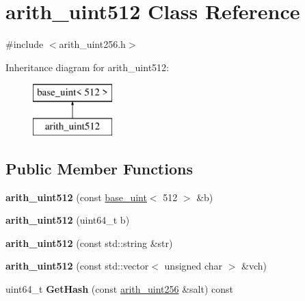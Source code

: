\hypertarget{classarith__uint512}{}\section{arith\+\_\+uint512 Class Reference}
\label{classarith__uint512}


{\ttfamily \#include $<$arith\+\_\+uint256.\+h$>$}

Inheritance diagram for arith\+\_\+uint512\+:\begin{figure}[H]
\begin{center}
\leavevmode
\includegraphics[height=2.000000cm]{classarith__uint512}
\end{center}
\end{figure}
\subsection*{Public Member Functions}
\begin{DoxyCompactItemize}
\item 
\mbox{\label{classarith__uint512_af8fa1e6795e1c5c1d1a634fb0fd3c436}} 
{\bfseries arith\+\_\+uint512} (const \mbox{\hyperlink{classbase__uint}{base\+\_\+uint}}$<$ 512 $>$ \&b)
\item 
\mbox{\label{classarith__uint512_acad15bc71a52323a5eb4402500f56b46}} 
{\bfseries arith\+\_\+uint512} (uint64\+\_\+t b)
\item 
\mbox{\label{classarith__uint512_af1ac85dcc8bcc5795318db17a400842f}} 
{\bfseries arith\+\_\+uint512} (const std\+::string \&str)
\item 
\mbox{\label{classarith__uint512_a1e191bef1043a256c447d56f4be85bb3}} 
{\bfseries arith\+\_\+uint512} (const std\+::vector$<$ unsigned char $>$ \&vch)
\item 
\mbox{\label{classarith__uint512_abcc699afad58bbf79033a1d52a4e7af8}} 
uint64\+\_\+t {\bfseries Get\+Hash} (const \mbox{\hyperlink{classarith__uint256}{arith\+\_\+uint256}} \&salt) const
\end{DoxyCompactItemize}
